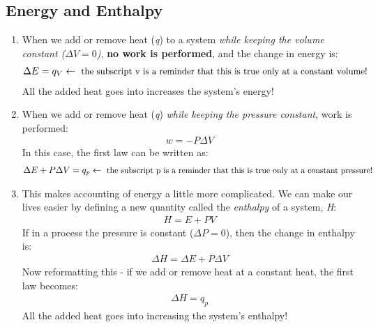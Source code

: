 \documentclass[../CHEM152Notes.tex]{subfiles}
\begin{document}
\subsection*{Energy and Enthalpy}
\begin{enumerate}
    \item When we add or remove heat (\emph{q}) to a system \emph{while keeping the volume constant ($\Delta V = 0$)}, \textbf{no work is performed}, and the change in energy is:
        \begin{equation*}
            \begin{aligned}
                \Delta E = q_V \leftarrow\text{\small{  the subscript v is a reminder that this is true only at a constant volume!}}
            \end{aligned}
        \end{equation*}
        All the added heat goes into increases the system's energy!
    \item When we add or remove heat (\emph{q}) \emph{while keeping the pressure constant}, work is performed:
        \begin{equation*}
            \begin{aligned}
                w = -P\Delta V
            \end{aligned}
        \end{equation*}
        In this case, the first law can be written as:
        \begin{equation*}
            \begin{aligned}
                \Delta E + P\Delta V = q_p \leftarrow\text{\small{  the subscript p is a reminder that this is true only at a constant pressure!}}
            \end{aligned}
        \end{equation*}
    \item This makes accounting of energy a little more complicated. We can make our lives easier by defining a new quantity called the \emph{enthalpy} of a system, \emph{H}:
        \begin{equation*}
            \begin{aligned}
                H = E + PV 
            \end{aligned}
        \end{equation*}
        If in a process the pressure is constant ($\Delta P = 0$), then the change in enthalpy is:
        \begin{equation*}
            \begin{aligned}
                \Delta H = \Delta E + P \Delta V
            \end{aligned}
        \end{equation*}
        Now reformatting this - if we add or remove heat at a constant heat, the first law becomes:
        \begin{equation*}
            \begin{aligned}
                \Delta H = q_p
            \end{aligned}
        \end{equation*}
        All the added heat goes into increasing the system's enthalpy!
\end{enumerate}
\end{document}
